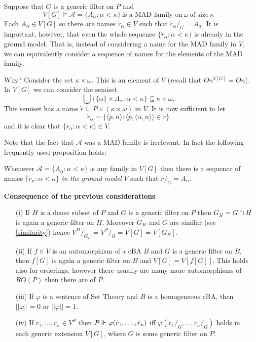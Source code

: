 \begin{example} Suppose that $G$ is a generic filter on $P$ and
$$
 V[G]\models \mathcal{A}=\{A_\alpha:\alpha<\kappa\}\ \mbox{is a MAD family on}\ \omega\ \mbox{of size}\ \kappa
$$
Each $A_\alpha\in V[G]$ so there are names $\dot{r}_\alpha\in V$ such
that $\dot{r}_\alpha/_G=A_\alpha$. It is important, however, that even the whole
sequence $\{\dot{r}_\alpha:\alpha<\kappa\}$ is already in the ground model. That
is, instead of considering a name for the MAD family in $V$, we can equivalently
consider a sequence of names for the elements of the MAD family.

Why? Consider the set $\kappa\times\omega$. This is an element of $V$ (recall
that $On^{V[G]}=On$). In $V[G]$ we can consider the semiset
$$\bigcup\big\{\{\alpha\}\times A_\alpha :\alpha<\kappa\big\}\subseteq\kappa\times\omega.$$
This semiset has a name $\dot{r}\subseteq P\times(\kappa\times\omega)$ in $V$.
It is now sufficient to let
$$\dot{r}_\alpha=\{\langle p,n\rangle:\langle p,\langle\alpha,n\rangle\rangle\in\dot{r}\}$$
and it is clear that $\{\dot{r}_\alpha:\alpha<\kappa\rangle\in V$.
\end{example}

Note that the fact that $\mathcal{A}$ was a MAD family is irrelevant.
In fact the following frequently used proposition holds:

\begin{proposition} Whenever $\mathcal{A}=\{A_\alpha:\alpha<\kappa\}$ is any family
in $V[G]$ then there is a sequence of names $\{\dot{r}_\alpha:\alpha<\kappa\}$ \emph{in the
ground model} $V$ such that $\dot{r}/_G=A_\alpha$.
\end{proposition}



\begin{proposition}{\bf Consequence of the previous considerations}
 \begin{itemize}
  \item[(i)] If $H$ is a dense subset of $P$ and $G$ is a generic filter on $P$ then $G_H=G\cap H$ is again a generic
             filter on $H$. Moreover $G_H$ and $G$ are similar (see \ref{similarity}) hence $V^H/_{G_H}=V^P/_{G}=V[G]=V[G_H]$.
  \item[(ii)] If $f\in V$ is an automorphism of a cBA $B$ and $G$ is a generic filter on $B$, then $f[G]$ is again a generic
             filter on $B$ and $V[G]=V[f[G]]$. This holds also for orderings, however there usually are many more automorphisms
             of $RO(P)$ then there are of $P$.
  \item[(iii)] If $\varphi$ is a sentence of Set Theory and $B$ is a homogeneous cBA, then $||\varphi||=0$ or $||\varphi||=1$.
  \item[(iv)] If $\dot{r}_1,\ldots,\dot{r}_n\in V^P$ then $P\Vdash \varphi(\dot{r}_1,\ldots,\dot{r}_n)$ iff $\varphi(\dot{r}_1/_G,\ldots,\dot{r}_n/_G)$
              holds in each generic extension $V[G]$, where $G$ is some generic filter on $P$.
 \end{itemize}
\end{proposition}

